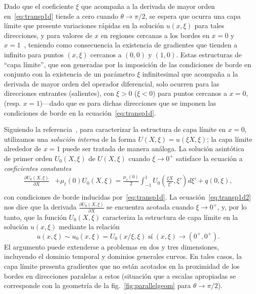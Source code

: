 Dado que el coeficiente $\xi$ que acompaña a la derivada de mayor 
orden en~\eqref{eq:transp1d} tiende a cero cuando $\theta \to \pi/2$, 
se espera que ocurra una capa límite que presente variaciones rápidas 
en la solución $u(x,\xi)$ para tales direcciones, y para valores 
de $x$ en regiones cercanas a los bordes en $x=0$ y $x=1$~\cite[Cap. 9]{Bender1999}, 
teniendo como consecuencia la existencia de gradientes que 
tienden a infinito para puntos $(x,\xi)$ cercanos a $(0,0)$ y $(1,0)$. 
Estas estructuras de ``capa límite'', que son generadas por 
la imposición de las condiciones de borde en conjunto con la existencia 
de un parámetro $\xi$ infinitesimal que acompaña a la derivada de mayor 
orden del operador diferencial, solo ocurren para las direcciones 
entrantes (salientes), con $\xi>0$ ($\xi<0$) para puntos cercanos 
a $x=0$, (resp. $x=1$)---dado que es para dichas direcciones que 
se imponen las condiciones de borde en la ecuación~\eqref{eq:transp1d}. 

Siguiendo la referencia~\cite{Bender1999}, para caracterizar
la estructura de capa límite en \eg $x=0$, utilizamos una 
{\em solución interna} de la forma $U(X,\xi) = u(\xi X,\xi)$; 
la capa límite alrededor de $x=1$ puede ser tratada de manera 
análoga. La solución asintótica de primer orden $U_0(X,\xi)$ 
de $U(X,\xi)$ cuando $\xi\to 0^+$ satisface la ecuación 
a {\em coeficientes constantes} 
\begin{equation}
\begin{split}
\frac{\partial U_0(X,\xi)}{\partial X}& + \mu_t(0) U_0(X,\xi)=\frac{\mu_s(0)}{2} 
\int_{-1}^{1} U_0\left(\frac{\xi X}{\xi'},\xi'\right) d\xi' +q(0,\xi),\\
\end{split}
\label{eq:transp1d2}
\end{equation}
con condiciones de borde inducidas por~\eqref{eq:transp1d}. 
La ecuación~\eqref{eq:transp1d2} nos dice que la derivada 
$\frac{\partial U_0(X,\xi)}{\partial X}$ se encuentra 
acotada cuando $\xi\to 0^+$, y, por lo tanto, que la función 
$U_0(X,\xi)$ caracteriza la estructura de capa límite 
en la solución $u(x,\xi)$ mediante la relación 
\begin{equation}
  u(x,\xi)\sim u_0(x,\xi) = U_0(x/\xi,\xi) \; \text{sí}  \;  (x,\xi)\to (0^+,0^+).
\end{equation}
El argumento puede extenderse a problemas en dos y tres dimensiones, 
incluyendo el dominio temporal y dominios generales curvos. En tales casos, 
la capa límite presenta gradientes que no están acotados 
en la proximidad de los bordes en direcciones paralelas a estos 
(situación que a escalas apropiadas se corresponde con la geometría 
de la fig.~\ref{fig:parallelgeom} para $\theta \to \pi/2$). 

